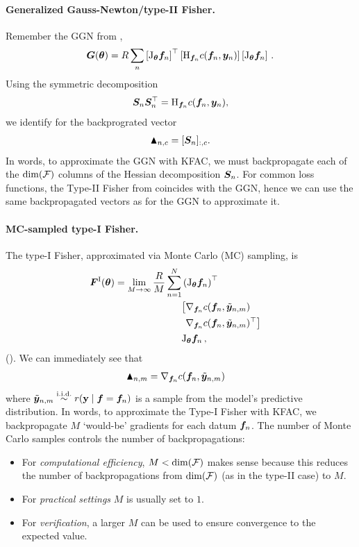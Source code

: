 \paragraph{Generalized Gauss-Newton/type-II Fisher.} Remember the GGN from ,
\begin{align*}
  {\bm{G}}({\bm{\theta}})= R \sum_n
  \left[\mathrm{J}_{{\bm{\theta}}} {\bm{f}}_n\right]^{\top}
  \left[\mathrm{H}_{{\bm{f}}_n} c({\bm{f}}_n, {\bm{y}}_n)
  \right]
  \left[\mathrm{J}_{{\bm{\theta}}} {\bm{f}}_n\right]\,.
\end{align*}
Using the symmetric decomposition
$${\bm{S}}_n {\bm{S}}_n^{\top} = \mathrm{H}_{{\bm{f}}_n} c({\bm{f}}_n, {\bm{y}}_n),$$ we identify for the backprograted vector
\begin{align*}
  \blacktriangle_{n,c} = [{\bm{S}}_n]_{:,c}.
\end{align*}
In words, to approximate the GGN with KFAC, we must backpropagate each of the $\dim({\mathcal{F}})$ columns of the Hessian decomposition ${\bm{S}}_n$.
For common loss functions, the Type-II Fisher from  coincides with the GGN, hence we can use the same backpropagated vectors as for the GGN to approximate it.

\paragraph{MC-sampled type-I Fisher.}
The type-I Fisher, approximated via Monte Carlo (MC) sampling, is
\begin{align*}
  &\begin{aligned}
    {\bm{F}}^{\text{I}}({\bm{\theta}}) = \lim_{M \to \infty} \frac{R}{M} \sum_{n=1}^N
    &\left( \mathrm{J}_{{\bm{\theta}}} {\bm{f}}_n\right)^{\top} \\
    &
      \begin{aligned}
        \big[
        &\nabla_{{\bm{f}}_n} c({\bm{f}}_n, \tilde{{\bm{y}}}_{n,m}) \\
        &\nabla_{{\bm{f}}_n} c({\bm{f}}_n, \tilde{{\bm{y}}}_{n,m})^{\top}
          \big]
      \end{aligned} \\
    &\mathrm{J}_{{\bm{\theta}}} {\bm{f}}_n\,,
  \end{aligned}
\end{align*}
().
We can immediately see that
\begin{align*}
  \blacktriangle_{n,m}
  &= \nabla_{{\bm{f}}_n}  c({\bm{f}}_n, \tilde{{\bm{y}}}_{n,m})
\end{align*}
where $\tilde{\vy}_{n,m} \stackrel{\text{\iid}}{\sim} r(\rvy \mid \vf = \vf_n)$ is a sample from the model's predictive distribution.
In words, to approximate the Type-I Fisher with KFAC, we backpropagate $M$ `would-be' gradients for each datum ${\bm{f}}_n$.
The number of Monte Carlo samples controls the number of backpropagations:
\begin{itemize}
\item For \emph{computational efficiency}, $M<\dim({\mathcal{F}})$ makes sense because this reduces the number of backpropagations from $\dim({\mathcal{F}})$ (as in the type-II case) to $M$.
\item For \emph{practical settings} $M$ is usually set to $1$.
\item For \emph{verification}, a larger $M$ can be used to ensure convergence to the expected value.
\end{itemize}

